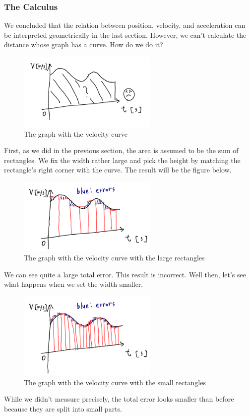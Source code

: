 \documentclass[pdflatex,sn-mathphys-num]{sn-jnl}%
\theoremstyle{thmstyleone}%
\theoremstyle{thmstyletwo}%
\theoremstyle{thmstylethree}%
\begin{document}
\subsubsection{The Calculus}
We concluded that the relation between position, velocity, and acceleration can be interpreted geometrically in the last section. However, we can't calculate the distance whose graph has a curve. How do we do it?
\begin{figure}[H]
	\centering
	\includegraphics[width=0.6\textwidth]{images/vCurve.png}
	\caption{The graph with the velocity curve}
	\label{vCurve}
\end{figure}

First, as we did in the previous section, the area is assumed to be the sum of rectangles. We fix the width rather large and pick the height by matching the rectangle's right corner with the curve. The result will be the figure below.
\begin{figure}[H]
	\centering
	\includegraphics[width=0.6\textwidth]{images/vCurveLargeRec.png}
	\caption{The graph with the velocity curve with the large rectangles}
	\label{vCurveLR}
\end{figure}
We can see quite a large total error. This result is incorrect. Well then, let's see what happens when we set the width smaller.
\begin{figure}[H]
	\centering
	\includegraphics[width=0.6\textwidth]{images/vCurveSmallRec.png}
	\caption{The graph with the velocity curve with the small rectangles}
	\label{vCurveSR}
\end{figure}
While we didn't measure precisely, the total error looks smaller than before because they are split into small parts.
\end{document}
